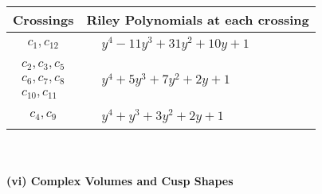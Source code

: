 \documentclass[1p]{elsarticle_modified}
\theoremstyle{definition}
\begin{document}
\begin{tabular}{m{50pt}|m{274pt}}
Crossings & \hspace{64pt}Riley Polynomials at each crossing \\
\hline $$\begin{aligned}c_{1},c_{12}\end{aligned}$$&$\begin{aligned}
&y^4-11 y^3+31 y^2+10 y+1
\end{aligned}$\\
\hline $$\begin{aligned}c_{2},c_{3},c_{5}\\c_{6},c_{7},c_{8}\\c_{10},c_{11}\end{aligned}$$&$\begin{aligned}
&y^4+5 y^3+7 y^2+2 y+1
\end{aligned}$\\
\hline $$\begin{aligned}c_{4},c_{9}\end{aligned}$$&$\begin{aligned}
&y^4+y^3+3 y^2+2 y+1
\end{aligned}$\\
\hline
\end{tabular}\\~\\
\newpage\flushleft \textbf{(vi) Complex Volumes and Cusp Shapes}
\end{document}
